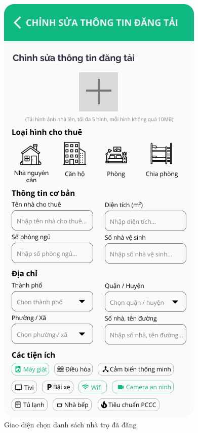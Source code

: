 \begin{figure}[!htb]
\begin{minipage}{0.32\textwidth}
     \caption{Giao diện chọn danh sách nhà trọ đã đăng}
   \end{minipage}\hfill
   \begin{minipage}{0.32\textwidth}
     \centering
     \includegraphics[width=1\linewidth]{Images/UI figma/Upload Rooming House 7.png}

\end{minipage}
\end{figure}
